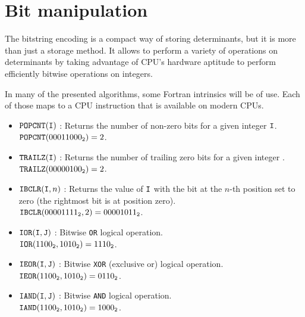 \documentclass[./thesis.tex]{subfiles}
\begin{document}
      
\section{Bit manipulation}

The bitstring encoding is a compact way of storing determinants, but it is more than just a storage method. It allows to perform a variety of operations on determinants by taking advantage of CPU's hardware aptitude to perform efficiently bitwise operations on integers.

In many of the presented algorithms, some Fortran intrinsics will be of use. Each of those maps to a CPU instruction that is available on modern CPUs.


\begin{sloppypar}
\begin{itemize}
	      
	\item $\text{\texttt{POPCNT}}({\texttt{I}})$ :
	Returns the number of non-zero bits for a given integer ${\texttt{I}}$. \\
        ${\text{\texttt{POPCNT}}({00011000_{\mathtt{2}}}) = 2}$.
	      
	\item $\text{\texttt{TRAILZ}}({\texttt{I}})$ : Returns the number of trailing zero bits for a given integer \bitI. \\
         ${\text{\texttt{TRAILZ}}({00000100_{\mathtt{2}}}) = 2}$.
	      
	      
	\item $\text{\texttt{IBCLR}}({\texttt{I}},n)$ : Returns the value of ${\texttt{I}}$ with the bit at the $n$-th position set to zero (the rightmost bit is at position zero). \\
        ${\text{\texttt{IBCLR}}({00001111_{\mathtt{2}}},2) = {00001011_{\mathtt{2}}}}$.
	      
	     
   	\item $\text{\texttt{IOR}}({\texttt{I}},{{\texttt{J}}})$ : Bitwise \texttt{OR} logical operation. \\
        ${\text{\texttt{IOR}}({1100_{\mathtt{2}}},{1010_{\mathtt{2}}}) = {1110_{\mathtt{2}}}}$.

	 
	\item $\text{\texttt{IEOR}}({\texttt{I}},{{\texttt{J}}})$ : Bitwise \texttt{XOR} (exclusive or) logical operation. \\
        ${\text{\texttt{IEOR}}({1100_{\mathtt{2}}},{1010_{\mathtt{2}}}) = {0110_{\mathtt{2}}}}$.
	      
	      
	\item $\text{\texttt{IAND}}({\texttt{I}},{{\texttt{J}}})$ : Bitwise \texttt{AND} logical operation. \\
        ${\text{\texttt{IAND}}({1100_{\mathtt{2}}},{1010_{\mathtt{2}}}) = {1000_{\mathtt{2}}}}$.
	      

\end{itemize}
\end{sloppypar}
\end{document}
